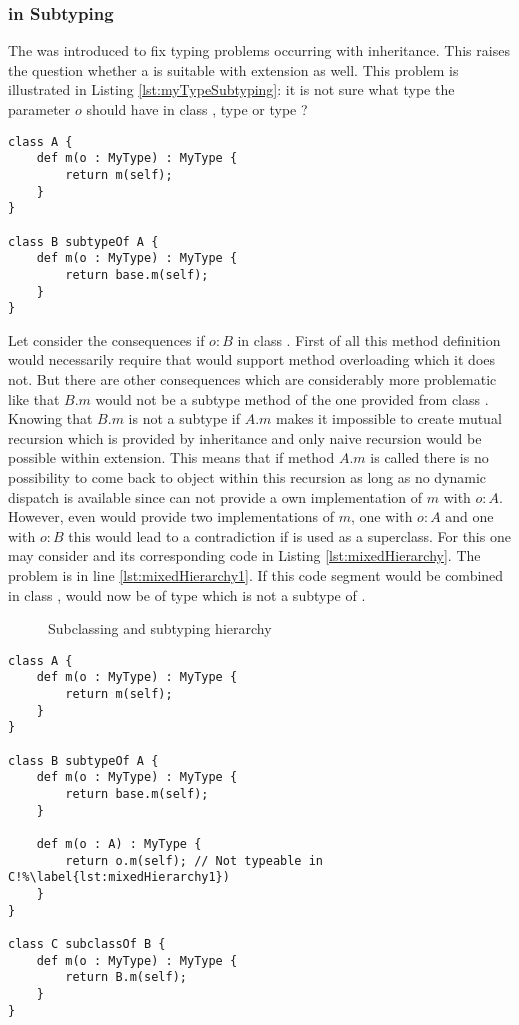 \subsubsection{\mytype in Subtyping}
\label{ssec:mytypeInSubtype}
The \mytype was introduced to fix typing problems occurring with
inheritance. This raises the question whether a \mytype is suitable
with extension as well. This problem is illustrated in Listing
\ref{lst:myTypeSubtyping}: it is not sure what type the parameter
$o$ should have in class \B, type \B or type \A? 

\begin{lstlisting}[float,language=ooplss,caption=\mytype within subtyping contexts,label=lst:myTypeSubtyping]
class A {
	def m(o : MyType) : MyType {
		return m(self);
	}
}

class B subtypeOf A {
	def m(o : MyType) : MyType {
		return base.m(self);
	}
}
\end{lstlisting}

Let consider the consequences if $o : B$ in class \B. First of all this
method definition would necessarily require that \ooplss would support
method overloading which it does not. But there are other consequences which
are considerably more problematic like that $B.m$ would not be a subtype method of the one
provided from class \A. Knowing that $B.m$ is not a subtype if $A.m$ 
makes it impossible to create mutual recursion which is provided by inheritance
and only naive recursion would be possible within extension. This means
that if method $A.m$ is called there is no possibility to come back to object \B 
within this recursion as long as no dynamic dispatch is available since \B can 
not provide a own implementation of $m$ with $o : A$. However, even \B would
provide two implementations of $m$, one with $o : A$ and one with $o : B$ this
would lead to a contradiction if \B is used as a superclass. For this one may
consider  and its corresponding code in Listing
\ref{lst:mixedHierarchy}. The problem is in line \ref{lst:mixedHierarchy1}. 
If this code segment would be combined in class \C, \self would now be of type
\C which is not a subtype of \A.

\begin{figure}[ht]
	\centering
	\caption{Subclassing and subtyping hierarchy}
	\label{fig:hierarchy}
\end{figure}

\begin{lstlisting}[float,language=ooplss,caption=Mixed extension and inheritance hierarchy,label=lst:mixedHierarchy]
class A {
	def m(o : MyType) : MyType {
		return m(self);
	}
}

class B subtypeOf A {
	def m(o : MyType) : MyType {
		return base.m(self);
	}

	def m(o : A) : MyType { 
		return o.m(self); // Not typeable in C!%\label{lst:mixedHierarchy1})
	}
}

class C subclassOf B {
	def m(o : MyType) : MyType {
		return B.m(self);
	}
}
\end{lstlisting}

